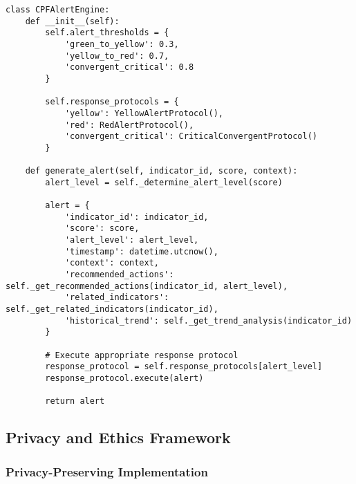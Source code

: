 \documentclass[11pt, onecolumn]{article}
\begin{document}
\begin{lstlisting}
class CPFAlertEngine:
    def __init__(self):
        self.alert_thresholds = {
            'green_to_yellow': 0.3,
            'yellow_to_red': 0.7,
            'convergent_critical': 0.8
        }
        
        self.response_protocols = {
            'yellow': YellowAlertProtocol(),
            'red': RedAlertProtocol(),
            'convergent_critical': CriticalConvergentProtocol()
        }
        
    def generate_alert(self, indicator_id, score, context):
        alert_level = self._determine_alert_level(score)
        
        alert = {
            'indicator_id': indicator_id,
            'score': score,
            'alert_level': alert_level,
            'timestamp': datetime.utcnow(),
            'context': context,
            'recommended_actions': self._get_recommended_actions(indicator_id, alert_level),
            'related_indicators': self._get_related_indicators(indicator_id),
            'historical_trend': self._get_trend_analysis(indicator_id)
        }
        
        # Execute appropriate response protocol
        response_protocol = self.response_protocols[alert_level]
        response_protocol.execute(alert)
        
        return alert
\end{lstlisting}

\subsection{Privacy and Ethics Framework}

\subsubsection{Privacy-Preserving Implementation}
\end{document}
